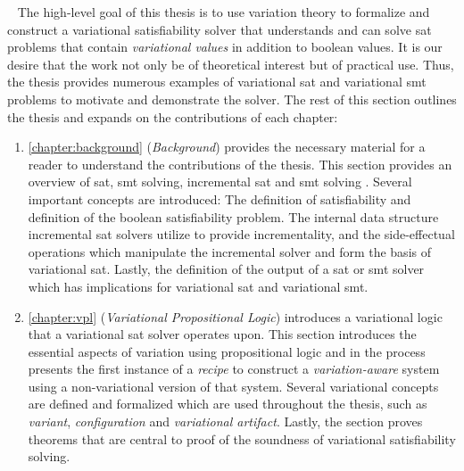 ~\label{section:contributions}
%
The high-level goal of this thesis is to use variation theory to formalize and
construct a variational satisfiability solver that understands and can solve
\ac{sat} problems that contain \emph{variational values} in addition to boolean
values. It is our desire that the work not only be of theoretical interest but
of practical use. Thus, the thesis provides numerous examples of variational
\ac{sat} and variational \ac{smt} problems to motivate and demonstrate the
solver. The rest of this section outlines the thesis and expands on the
contributions of each chapter:

  \begin{enumerate}
  \item \autoref{chapter:background} (\emph{Background}) provides the necessary
    material for a reader to understand the contributions of the thesis. This
    section provides an overview of \acl{sat}, \acl{smt} solving, incremental
    \ac{sat} and \ac{smt} solving . Several important concepts are introduced:
    The definition of satisfiability and definition of the boolean
    satisfiability problem. The internal data structure incremental \ac{sat}
    solvers utilize to provide incrementality, and the side-effectual operations
    which manipulate the incremental solver and form the basis of variational
    \acl{sat}. Lastly, the definition of the output of a \ac{sat} or \ac{smt}
    solver which has implications for variational \acl{sat} and variational
    \ac{smt}.

  \item \autoref{chapter:vpl} (\emph{Variational Propositional Logic})
    introduces a variational logic that a variational \ac{sat} solver operates
    upon. This section introduces the essential aspects of variation using
    propositional logic and in the process presents the first instance of a
    \emph{\recipe{} recipe} to construct a \emph{variation-aware}
    system using a non-variational version of that system. Several variational
    concepts are defined and formalized which are used throughout the thesis,
    such as \emph{variant}, \emph{configuration} and \emph{variational
      artifact}. Lastly, the section proves theorems that are central to proof
    of the soundness of variational satisfiability solving.


\end{enumerate}
